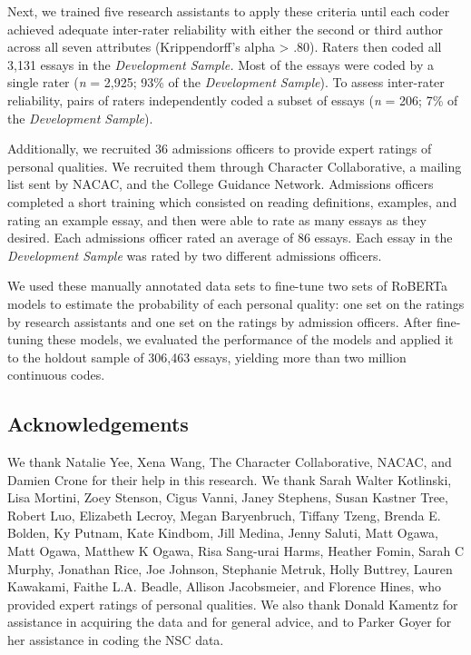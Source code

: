 \documentclass[11pt]{report}
\begin{document}
\begin{mainf}
Next, we trained five research assistants to apply these criteria until each coder achieved adequate inter-rater reliability with either the second or third author across all seven attributes (Krippendorff’s alpha > .80). Raters then coded all 3,131 essays in the \textit{Development Sample.} Most of the essays were coded by a single rater (\textit{n} = 2,925; 93\% of the \textit{Development Sample}). To assess inter-rater reliability, pairs of raters independently coded a subset of essays (\textit{n} = 206; 7\% of the \textit{Development Sample}). 

Additionally, we recruited 36 admissions officers to provide expert ratings of personal qualities. We recruited them through Character Collaborative, a mailing list sent by NACAC, and the College Guidance Network. Admissions officers completed a short training which consisted on reading definitions, examples, and rating an example essay, and then were able to rate as many essays as they desired. Each admissions officer rated an average of 86 essays. Each essay in the \textit{Development Sample} was rated by two different admissions officers.

We used these manually annotated data sets to fine-tune two sets of  RoBERTa models to estimate the probability of each personal quality: one set on the ratings by research assistants and one set on the ratings by admission officers. After fine-tuning these models, we evaluated the performance of the models and applied it to the holdout sample of 306,463 essays, yielding more than two million continuous codes.


\subsection{Acknowledgements}
We thank Natalie Yee, Xena Wang, The Character Collaborative, NACAC, and Damien Crone for their help in this research. We thank Sarah Walter Kotlinski, Lisa Mortini, Zoey Stenson, Cigus Vanni, Janey Stephens, Susan Kastner Tree, Robert Luo, Elizabeth Lecroy, Megan Baryenbruch, Tiffany Tzeng, Brenda E. Bolden, Ky Putnam, Kate Kindbom, Jill Medina, Jenny Saluti, Matt Ogawa, Matt Ogawa, Matthew K Ogawa, Risa Sang-urai Harms, Heather Fomin, Sarah C Murphy, Jonathan Rice, Joe Johnson, Stephanie Metruk, Holly Buttrey, Lauren Kawakami, Faithe L.A. Beadle, Allison Jacobsmeier, and Florence Hines, who provided expert ratings of personal qualities. We also thank Donald Kamentz for assistance in acquiring the data and for general advice, and to Parker Goyer for her assistance in coding the NSC data. 


\end{mainf}
\end{document}
